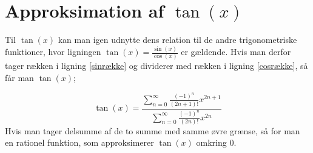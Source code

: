 

\section{Approksimation af $\tan(x)$}

Til $\tan(x)$ kan man igen udnytte dens relation til de andre trigonometriske funktioner, hvor ligningen $\tan(x)=\frac{\sin(x)}{\cos(x)}$ er gældende. Hvis man derfor tager rækken i ligning \ref{sinrække} og dividerer med rækken i ligning \ref{cosrække}, så får man $\tan(x)$;

\begin{equation}\label{tanbrøk}
\tan(x)
=
\frac{\sum_{n=0}^{\infty} \frac{(-1)^n}{(2n+1)!}x^{2n+1}}
{\sum_{n=0}^{\infty} \frac{(-1)^n}{(2n)!}x^{2n}}
\end{equation}
Hvis man tager delsumme af de to summe med samme øvre grænse, så for man en rationel funktion, som approksimerer $\tan(x)$ omkring $0$.

